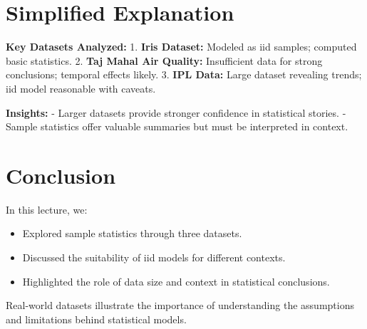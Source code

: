 \documentclass{article}
\begin{document}
\section*{Simplified Explanation}

\textbf{Key Datasets Analyzed:}
1. \textbf{Iris Dataset:} Modeled as iid samples; computed basic statistics.
2. \textbf{Taj Mahal Air Quality:} Insufficient data for strong conclusions; temporal effects likely.
3. \textbf{IPL Data:} Large dataset revealing trends; iid model reasonable with caveats.

\textbf{Insights:}
- Larger datasets provide stronger confidence in statistical stories.
- Sample statistics offer valuable summaries but must be interpreted in context.

\section*{Conclusion}

In this lecture, we:
\begin{itemize}
  \item Explored sample statistics through three datasets.
  \item Discussed the suitability of iid models for different contexts.
  \item Highlighted the role of data size and context in statistical conclusions.
\end{itemize}

Real-world datasets illustrate the importance of understanding the assumptions and limitations behind statistical models.
\end{document}
